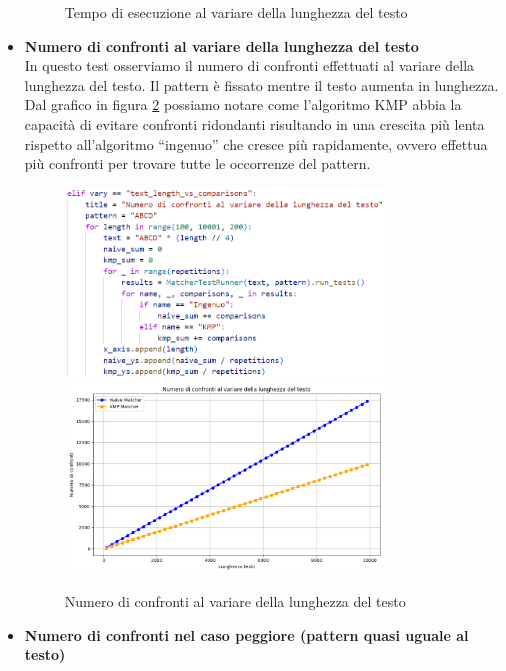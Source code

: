 \documentclass{article}
\begin{document}
\begin{itemize}
\begin{figure}[H]
            \caption{Tempo di esecuzione al variare della lunghezza del testo}
            \label{fig:test-1}
        \end{figure}
    \newpage
    \item \textbf{Numero di confronti al variare della lunghezza del testo}\\
        In questo test osserviamo il numero di confronti effettuati al variare della lunghezza del testo. Il pattern è fissato mentre il testo aumenta in lunghezza. Dal grafico in figura \ref{fig:test-2} possiamo notare come l'algoritmo KMP abbia la capacità di evitare confronti ridondanti risultando in una crescita più lenta rispetto all'algoritmo ``ingenuo'' che cresce più rapidamente, ovvero effettua più confronti per trovare tutte le occorrenze del pattern.
        \begin{figure}[H]
            \centering
            \includegraphics[width=0.8\textwidth]{img/Test2.png}
            \includegraphics[width=0.8\textwidth]{img/Graph2.png}
            \caption{Numero di confronti al variare della lunghezza del testo}
            \label{fig:test-2}
        \end{figure}
    \newpage
    \item \textbf{Numero di confronti nel caso peggiore (pattern quasi uguale al testo)}\\

\end{itemize}
\end{document}
